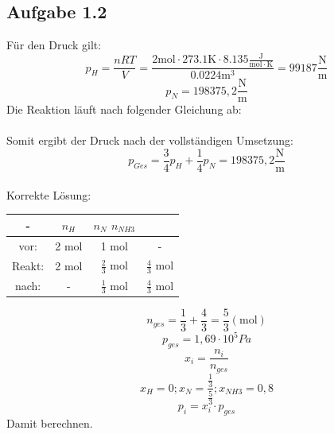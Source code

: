 \documentclass{article}
\begin{document}
\subsection*{Aufgabe 1.2}
Für den Druck gilt:
\begin{equation*}
    p_H=\frac{nRT}{V}=\frac{ 2 \mathrm{mol}\cdot 273.1 \mathrm{K} \cdot 8.135 \mathrm{\frac{J}{mol\cdot K}}}{ 0.0224 \mathrm{m^3}} = 99187 \mathrm{\frac{N}{m}}
\end{equation*}
\begin{equation*}
    p_N= 198375,2 \mathrm{\frac{N}{m}}
\end{equation*}
Die Reaktion läuft nach folgender Gleichung ab:\\
\\
Somit ergibt der Druck nach der vollständigen Umsetzung:
\begin{equation*}
    p_{Ges}=\frac{3}{4}p_H + \frac{1}{4}p_N = 198375,2 \frac{\mathrm{N}}{\mathrm{m}}
\end{equation*}
\\
Korrekte Lösung:
\begin{center}
    \begin{tabular}{c c c c}
        \hline
        - & $n_H$ & $n_N$ $n_{NH3}$\\
        \hline
        vor: & 2 mol & 1 mol & -\\
        Reakt: & 2 mol & $\frac{2}{3}$ mol & $\frac{4}{3}$ mol\\
        nach: & - & $\frac{1}{3}$ mol & $\frac{4}{3}$ mol\\ 
        \hline
    \end{tabular}
\end{center}
\begin{equation*}
    n_{ges}=\frac{1}{3} + \frac{4}{3} = \frac{5}{3} ( \mathrm{mol})
\end{equation*}
\begin{equation*}
    p_{ges} = 1,69 \cdot 10^5 Pa
\end{equation*}
\begin{equation*}
    x_i = \frac{n_i}{n_{ges}}
\end{equation*}
\begin{equation*}
    x_H = 0; x_N = \frac{\frac{1}{3}}{\frac{5}{3}}; x_{NH3}=0,8
\end{equation*}
\begin{equation*}
    p_i = x_i \cdot p_{ges}
\end{equation*}
Damit berechnen.
\end{document}

